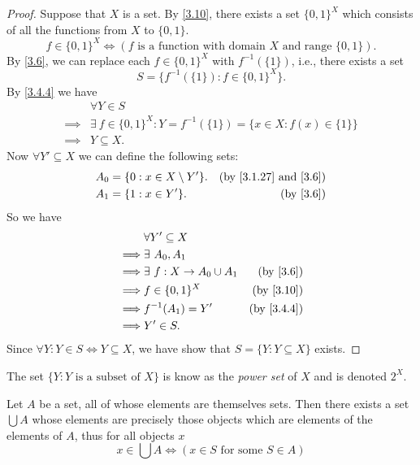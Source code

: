 \begin{proof}
  Suppose that \(X\) is a set.
  By \cref{3.10}, there exists a set \(\{0, 1\}^X\) which consists of all the functions from \(X\) to \(\{0, 1\}\).
  \[
    f \in \{0, 1\}^X \iff (f \text{ is a function with domain } X \text{ and range } \{0, 1\}).
  \]
  By \cref{3.6}, we can replace each \(f \in \{0, 1\}^X\) with \(f^{-1}(\{1\})\), i.e., there exists a set
  \[
    S = \{f^{-1}(\{1\}) : f \in \{0, 1\}^X\}.
  \]
  By \cref{3.4.4} we have
  \begin{align*}
             & \forall Y \in S                                                              \\
    \implies & \exists\ f \in \{0, 1\}^X : Y = f^{-1}(\{1\}) = \{x \in X : f(x) \in \{1\}\} \\
    \implies & Y \subseteq X.
  \end{align*}
  Now \(\forall Y' \subseteq X\) we can define the following sets:
  \begin{align*}
    A_0 & = \{0 : x \in X \setminus Y'\}. & \text{(by \cref{3.1.27} and \cref{3.6})} \\
    A_1 & = \{1 : x \in Y'\}.             & \text{(by \cref{3.6})}
  \end{align*}
  So we have
  \begin{align*}
             & \forall Y' \subseteq X                                     \\
    \implies & \exists\ A_0, A_1                                          \\
    \implies & \exists\ f : X \to A_0 \cup A_1 & \text{(by \cref{3.6})}   \\
    \implies & f \in \{0, 1\}^X                & \text{(by \cref{3.10})}  \\
    \implies & f^{-1}(A_1) = Y'                & \text{(by \cref{3.4.4})} \\
    \implies & Y' \in S.
  \end{align*}
  Since \(\forall Y : Y \in S \iff Y \subseteq X\), we have show that \(S = \{Y : Y \subseteq X\}\) exists.
\end{proof}

\begin{rmk}\label{3.4.10}
  The set \(\{Y : Y \text{ is a subset of } X\}\) is know as the \emph{power set} of \(X\) and is denoted \(2^X\).
\end{rmk}

\begin{ax}[Union]\label{3.11}
  Let \(A\) be a set, all of whose elements are themselves sets.
  Then there exists a set \(\bigcup A\) whose elements are precisely those objects which are elements of the elements of \(A\), thus for all objects \(x\)
  \[
    x \in \bigcup A \iff (x \in S \text{ for some } S \in A)
  \]
\end{ax}

